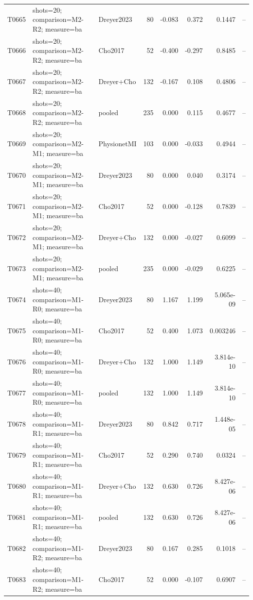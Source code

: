 \begin{longtable}{p{.45in}p{2.6in}p{.75in}rrrrr}
T0665 & shots=20; comparison=M2-R2; measure=ba & Dreyer2023 & 80 & -0.083 & 0.372 & 0.1447 & -- \\
T0666 & shots=20; comparison=M2-R2; measure=ba & Cho2017 & 52 & -0.400 & -0.297 & 0.8485 & -- \\
T0667 & shots=20; comparison=M2-R2; measure=ba & Dreyer+Cho & 132 & -0.167 & 0.108 & 0.4806 & -- \\
T0668 & shots=20; comparison=M2-R2; measure=ba & pooled & 235 & 0.000 & 0.115 & 0.4677 & -- \\
T0669 & shots=20; comparison=M2-M1; measure=ba & PhysionetMI & 103 & 0.000 & -0.033 & 0.4944 & -- \\
T0670 & shots=20; comparison=M2-M1; measure=ba & Dreyer2023 & 80 & 0.000 & 0.040 & 0.3174 & -- \\
T0671 & shots=20; comparison=M2-M1; measure=ba & Cho2017 & 52 & 0.000 & -0.128 & 0.7839 & -- \\
T0672 & shots=20; comparison=M2-M1; measure=ba & Dreyer+Cho & 132 & 0.000 & -0.027 & 0.6099 & -- \\
T0673 & shots=20; comparison=M2-M1; measure=ba & pooled & 235 & 0.000 & -0.029 & 0.6225 & -- \\
T0674 & shots=40; comparison=M1-R0; measure=ba & Dreyer2023 & 80 & 1.167 & 1.199 & 5.065e-09 & -- \\
T0675 & shots=40; comparison=M1-R0; measure=ba & Cho2017 & 52 & 0.400 & 1.073 & 0.003246 & -- \\
T0676 & shots=40; comparison=M1-R0; measure=ba & Dreyer+Cho & 132 & 1.000 & 1.149 & 3.814e-10 & -- \\
T0677 & shots=40; comparison=M1-R0; measure=ba & pooled & 132 & 1.000 & 1.149 & 3.814e-10 & -- \\
T0678 & shots=40; comparison=M1-R1; measure=ba & Dreyer2023 & 80 & 0.842 & 0.717 & 1.448e-05 & -- \\
T0679 & shots=40; comparison=M1-R1; measure=ba & Cho2017 & 52 & 0.290 & 0.740 & 0.0324 & -- \\
T0680 & shots=40; comparison=M1-R1; measure=ba & Dreyer+Cho & 132 & 0.630 & 0.726 & 8.427e-06 & -- \\
T0681 & shots=40; comparison=M1-R1; measure=ba & pooled & 132 & 0.630 & 0.726 & 8.427e-06 & -- \\
T0682 & shots=40; comparison=M1-R2; measure=ba & Dreyer2023 & 80 & 0.167 & 0.285 & 0.1018 & -- \\
T0683 & shots=40; comparison=M1-R2; measure=ba & Cho2017 & 52 & 0.000 & -0.107 & 0.6907 & -- \\

\end{longtable}
